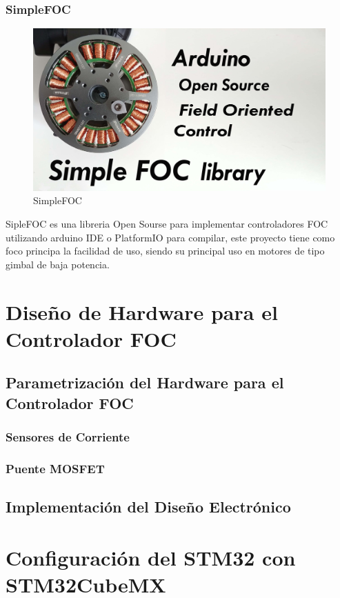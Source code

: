 \documentclass[11pt]{report}
\begin{document}
\subsection{SimpleFOC}
\begin{figure}[ht]
	\centering
	\includegraphics[scale=0.05]{imagenes/simpleFOC.jpeg}
	\caption{SimpleFOC}
\end{figure}
\FloatBarrier

SipleFOC \cite{Skuric_SimpleFOC_A_Field_2022} es una libreria Open Sourse para implementar controladores FOC utilizando arduino IDE o PlatformIO para compilar, este proyecto tiene como foco principa la facilidad de uso, siendo su principal uso en motores de tipo gimbal de baja potencia.

\newpage
\chapter{Diseño de Hardware para el Controlador FOC}
\section{Parametrización del Hardware para el Controlador FOC}
\subsection{Sensores de Corriente}
\subsection{Puente MOSFET}
\section{Implementación del Diseño Electrónico}

\newpage
\chapter{Configuración del STM32 con STM32CubeMX}
\end{document}
